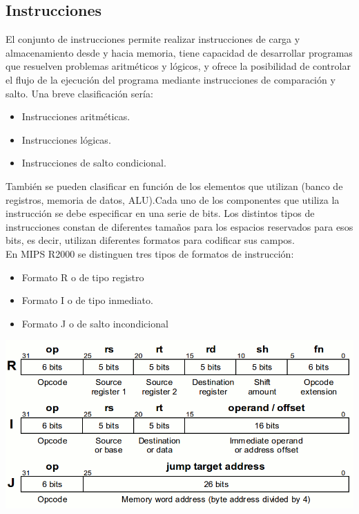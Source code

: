 \documentclass[12pt]{article}
\begin{document}
\subsection{Instrucciones}
El conjunto de instrucciones permite realizar instrucciones de carga y almacenamiento
desde y hacia memoria, tiene capacidad de desarrollar programas que resuelven problemas aritméticos y lógicos, y ofrece la posibilidad de controlar el flujo de la ejecución del programa mediante instrucciones de comparación y salto.
Una breve clasificación sería:
\begin{itemize}
\item Instrucciones aritméticas.
\item Instrucciones lógicas.
\item Instrucciones de salto condicional.
\end{itemize}
También se pueden clasificar en función de los elementos que utilizan (banco de registros, memoria de datos, ALU).Cada uno de los componentes que utiliza la instrucción se debe especificar en una serie de bits. Los distintos tipos de instrucciones
constan de diferentes tamaños para los espacios reservados para esos bits, es decir, utilizan diferentes formatos para codificar sus campos.\\
En MIPS R2000 se distinguen tres tipos de formatos de instrucción:
\begin{itemize}
\item Formato R o de tipo registro
\item Formato I o de tipo inmediato.
\item Formato J o de salto incondicional
\end{itemize}
\begin{center}
\includegraphics[width=\textwidth,keepaspectratio]{formatos.png}
\end{center}

    
\end{document}
